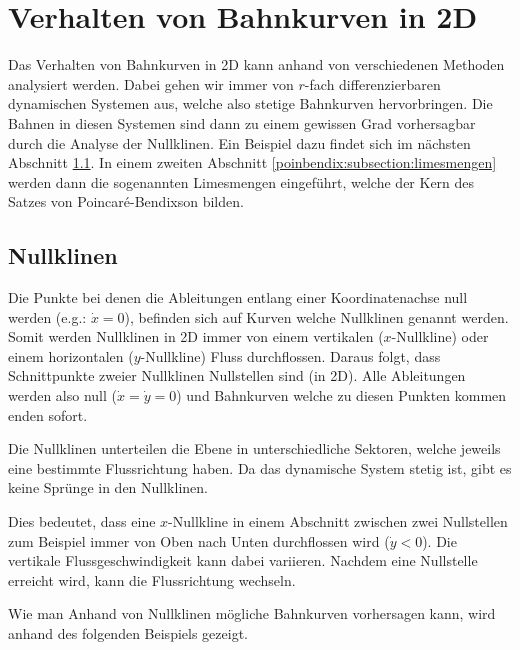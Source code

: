 \section{Verhalten von Bahnkurven in 2D} \label{poinbendix:section:nullklinen}

Das Verhalten von Bahnkurven in 2D kann anhand von verschiedenen Methoden analysiert werden.
Dabei gehen wir immer von $r$-fach differenzierbaren dynamischen Systemen aus, welche also stetige Bahnkurven hervorbringen.
Die Bahnen in diesen Systemen sind dann zu einem gewissen Grad vorhersagbar durch die Analyse der Nullklinen.
Ein Beispiel dazu findet sich im nächsten Abschnitt \ref{poinbendix:subsection:nullklinen}.
In einem zweiten Abschnitt \ref{poinbendix:subsection:limesmengen} werden dann die sogenannten Limesmengen eingeführt, welche der Kern des Satzes von Poincaré-Bendixson bilden.

\subsection{Nullklinen} \label{poinbendix:subsection:nullklinen}

Die Punkte bei denen die Ableitungen entlang einer Koordinatenachse null werden (e.g.: $\dot{x}=0$), befinden sich auf Kurven welche Nullklinen genannt werden. %
Somit werden Nullklinen in 2D immer von einem vertikalen ($x$-Nullkline) oder einem horizontalen ($y$-Nullkline) Fluss durchflossen.
Daraus folgt, dass Schnittpunkte zweier Nullklinen Nullstellen sind (in 2D).
Alle Ableitungen werden also null ($\dot{x}=\dot{y}=0$) und Bahnkurven welche zu diesen Punkten kommen enden sofort.

Die Nullklinen unterteilen die Ebene in unterschiedliche Sektoren, welche jeweils eine bestimmte Flussrichtung haben.
Da das dynamische System stetig ist, gibt es keine Sprünge in den Nullklinen.

Dies bedeutet, dass eine $x$-Nullkline in einem Abschnitt zwischen zwei Nullstellen zum Beispiel immer von Oben nach Unten durchflossen wird ($\dot{y} < 0$).
Die vertikale Flussgeschwindigkeit kann dabei variieren.
Nachdem eine Nullstelle erreicht wird, kann die Flussrichtung wechseln.

Wie man Anhand von Nullklinen mögliche Bahnkurven vorhersagen kann, wird anhand des folgenden Beispiels gezeigt.

